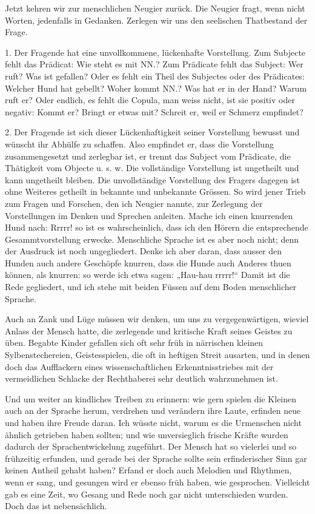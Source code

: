 Jetzt kehren wir zur menschlichen Neugier zurück. Die Neugier fragt, wenn nicht  Worten, jedenfalls in Gedanken. Zerlegen wir uns den seelischen Thatbestand der Frage.

1. Der Fragende hat eine unvollkommene, lückenhafte Vorstellung. Zum Subjecte fehlt das Prädicat: Wie steht es mit NN.? Zum Prädicate fehlt das Subject: Wer ruft? Was ist gefallen? Oder es fehlt ein Theil des Subjectes oder des Prädicates: Welcher Hund hat gebellt? Woher kommt NN.? Was hat er in der Hand? Warum ruft er? Oder endlich, es fehlt die Copula, man weiss nicht, ist sie positiv oder negativ: Kommt er? Bringt er etwas mit? Schreit er, weil er Schmerz empfindet?

\label{fp.301}

2. Der Fragende ist sich dieser Lückenhaftigkeit seiner Vorstellung bewusst und wünscht ihr Abhülfe zu schaffen. Also empfindet er, dass die Vorstellung zusammengesetzt und zerlegbar ist, er trennt das Subject vom Prädicate, die Thätigkeit vom Objecte u. s. w. Die vollständige Vorstellung ist ungetheilt und kann ungetheilt bleiben. Die unvollständige Vorstellung des Fragers dagegen ist ohne Weiteres getheilt in bekannte und unbekannte Grössen. So wird jener Trieb zum Fragen und Forschen, den ich Neugier nannte, zur Zerlegung der Vorstellungen im Denken und Sprechen anleiten. Mache ich einen knurrenden Hund nach: Rrrrr! so ist es wahrscheinlich, dass ich  den Hörern die entsprechende Gesammtvorstellung erwecke. Menschliche Sprache ist es aber noch nicht; denn der Ausdruck ist noch ungegliedert. Denke ich aber daran, dass ausser den Hunden auch andere Geschöpfe knurren, dass die Hunde auch Anderes thuen können, als knurren: so werde ich etwa sagen: „Hau-hau rrrrr!“ Damit ist die Rede gegliedert, und ich stehe mit beiden Füssen auf dem Boden menschlicher Sprache.

Auch an Zank und Lüge müssen wir denken, um uns zu vergegenwärtigen, wieviel Anlass der Mensch hatte, die zerlegende und kritische Kraft seines Geistes zu üben. Begabte Kinder gefallen sich oft sehr früh in närrischen kleinen \label{sp.311} Sylbenstechereien, Geistesspielen, die oft in heftigen Streit ausarten, und in denen doch das Aufflackern eines wissenschaftlichen Erkenntnisstriebes mit der vermeidlichen Schlacke der Rechthaberei sehr deutlich wahrzunehmen ist.

Und um weiter an kindliches Treiben zu erinnern: wie gern spielen die Kleinen auch an der Sprache herum, verdrehen und verändern ihre Laute, erfinden neue und haben ihre Freude daran. Ich wüsste nicht, warum es die Urmenschen nicht ähnlich getrieben haben sollten; und wie unversieglich frische Kräfte wurden dadurch der Sprachentwickelung zugeführt. Der Mensch hat so vielerlei und so frühzeitig erfunden, und gerade bei der Sprache sollte sein erfinderischer Sinn gar keinen Antheil gehabt haben? Erfand er doch auch Melodien und Rhythmen, wenn er sang, und gesungen wird er  ebenso früh haben, wie gesprochen. Vielleicht gab es eine Zeit, wo Gesang und Rede noch gar nicht unterschieden wurden. Doch das ist nebensächlich.


